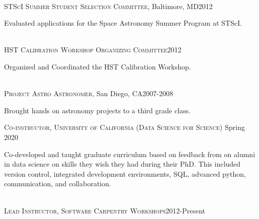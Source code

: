 \documentclass[10pt]{cv}
\begin{document}
\begin{llist}
\\
\textsc{STScI Summer Student Selection Committee}, Baltimore, MD\hfill2012\\
\begin{minipage}[l]{0.7\textwidth}\vspace{0.15cm}
Evaluated applications for the Space Astronomy Summer Program at STScI.\\
\end{minipage}\vspace{0.15cm}
\\
\textsc{HST Calibration Workshop Organizing Committee}\hfill 2012\\
\begin{minipage}[l]{0.7\textwidth}\vspace{0.15cm}
Organized and Coordinated the HST Calibration Workshop.\\
\end{minipage}\vspace{0.15cm}
\\
\textsc{Project Astro Astronomer}, San Diego, CA\hfill 2007-2008\\
\begin{minipage}[l]{0.7\textwidth}\vspace{0.15cm}
Brought hands on astronomy projects to a third grade class.\\
\end{minipage}\vspace{0.15cm}
\vspace{-0.1in}   
\textsc{Co-instructor, University of California (Data Science for Science)} \hfill Spring 2020\\
\begin{minipage}[l]{0.7\textwidth}\vspace{0.15cm}
Co-developed and taught graduate curriculum based on feedback from on alumni in data science on skills they wish they had during their PhD. This included version control, integrated development environments, SQL, advanced python, communication, and collaboration.\\
\end{minipage}\vspace{0.15cm}
\\
\textsc{Lead Instructor, Software Carpentry Workshops}\hfill 2012-Present\\

\end{llist}
\end{document}
